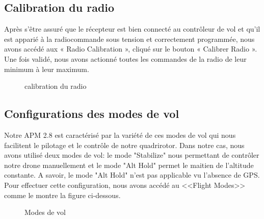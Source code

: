 	
	\newpage
	\subsection{Calibration du radio}
	Après s’être assuré que le récepteur est bien connecté au contrôleur de vol et qu’il est apparié à la
	radiocommande sous tension et correctement programmée, nous avons  accédé aux « Radio
	Calibration », cliqué sur le bouton « Calibrer Radio ». 
	Une fois validé, nous avons actionné toutes les commandes de la radio de leur minimum à leur maximum. 
	\begin{figure} [h]
		\begin{center}
			\centering
		\end{center}
		\caption{calibration du radio}
	\end{figure}
	
	\subsection{Configurations des modes de vol} 
	Notre APM 2.8 est caractérisé par la variété de ces modes de vol qui nous facilitent le pilotage et le contrôle de notre quadrirotor. Dans notre cas, nous avons utilisé deux modes de vol: le mode "Stabilize" nous permettant de contrôler notre drone manuellement et le mode "Alt Hold" permet le maitien de l'altitude constante. A savoir, le mode "Alt Hold" n'est pas applicable vu l'absence de GPS. Pour effectuer  cette configuration, nous avons accédé au <<Flight Modes>> comme le montre la figure ci-dessous.
	
	\begin{figure} [h]
		\begin{center}
			\centering
		\end{center}
		\caption{Modes de vol}
	\end{figure}
	\newpage
